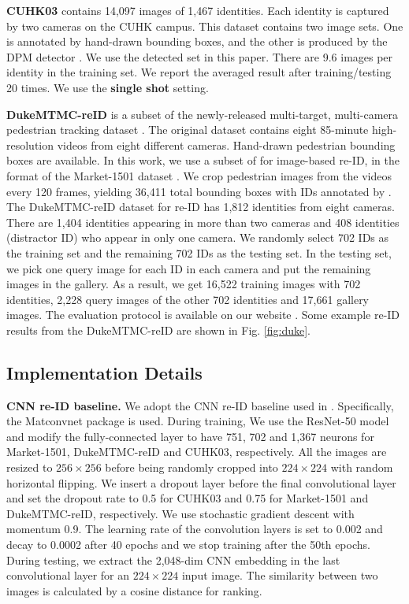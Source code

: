 \documentclass[10pt,twocolumn,letterpaper]{article}
\begin{document}
\textbf{CUHK03} contains 14,097 images of 1,467 identities. Each identity is captured by two cameras on the CUHK campus. This dataset contains two image sets. One is annotated by hand-drawn bounding boxes, and the other is produced by the DPM detector \cite{felzenszwalb2010object}. We use the detected set in this paper. There are 9.6 images per identity in the training set. We report the averaged result after training/testing 20 times. We use the \textbf{single shot} setting.

\textbf{DukeMTMC-reID} is a subset of the newly-released multi-target, multi-camera pedestrian tracking dataset \cite{ristani2016MTMC}. The original dataset contains eight 85-minute high-resolution videos from eight different cameras. Hand-drawn pedestrian bounding boxes are available. In this work, we use a subset of \cite{ristani2016MTMC} for image-based re-ID, in the format of the Market-1501 dataset \cite{zheng2015scalable}. We crop pedestrian images from the videos every 120 frames, yielding 36,411 total bounding boxes with IDs annotated by \cite{ristani2016MTMC}. The DukeMTMC-reID dataset for re-ID  has 1,812 identities from eight cameras. There are 1,404 identities appearing in more than two cameras and 408 identities (distractor ID) who appear in only one camera. We randomly select 702 IDs as the training set and the remaining 702 IDs as the testing set. In the testing set, we pick one query image for each ID in each camera and put the remaining images in the gallery. As a result, we get 16,522 training images with 702 identities, 2,228 query images of the other 702 identities and 17,661 gallery images. The evaluation protocol is available on our website \cite{DukeMTMC-reID}. Some example re-ID results from the DukeMTMC-reID are shown in Fig. \ref{fig:duke}.

\subsection{Implementation Details}\label{sec:details}
\textbf{CNN re-ID baseline.} We adopt the CNN re-ID baseline used in \cite{zheng2016survey,zheng2016person}. Specifically, the Matconvnet \cite{vedaldi15matconvnet} package is used. During training, We use the ResNet-50 model \cite{he2016deep} and modify the fully-connected layer to have 751, 702 and 1,367 neurons for Market-1501, DukeMTMC-reID and CUHK03, respectively. All the images are resized to $256\times256$ before being randomly cropped into $224\times224$ with random horizontal flipping. We insert a dropout layer before the final convolutional layer and set the dropout rate to 0.5 for CUHK03 and 0.75 for Market-1501 and DukeMTMC-reID, respectively. We use stochastic gradient descent with momentum 0.9. The learning rate of the convolution layers is set to 0.002 and decay to 0.0002 after 40 epochs and we stop training after the 50th epochs. During testing, we extract the 2,048-dim CNN embedding in the last convolutional layer for an $224\times224$ input image. The similarity between two images is calculated by a cosine distance for ranking.
\end{document}
